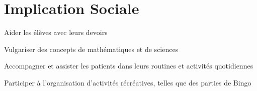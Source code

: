 \documentclass[letterpaper,10pt]{article}
\begin{document}

  \section{Implication Sociale}

  \begin{resume_list}
    \item Aider les élèves avec leurs devoirs
    \item Vulgariser des concepts de mathématiques et de sciences
  \end{resume_list}
  
\begin{resume_list}
    \item Accompagner et assister les patients dans leurs routines et activités quotidiennes
    \item Participer à l'organisation d'activités récréatives, telles que des parties de Bingo
\end{resume_list}
\end{document}
